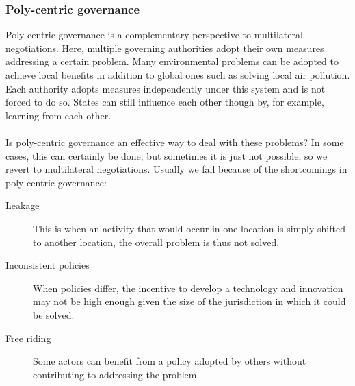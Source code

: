\documentclass[../summary.tex]{subfiles}
\begin{document}
		\subsubsection{Poly-centric governance}
			Poly-centric governance is a complementary perspective to multilateral negotiations. Here, multiple governing authorities adopt their own measures addressing a certain problem. Many environmental problems can be adopted to achieve local benefits in addition to global ones such as solving local air pollution. Each authority adopts measures independently under this system and is not forced to do so. States can still influence each other though by, for example, learning from each other. \\
			\\
			 Is poly-centric governance an effective way to deal with these problems? In some cases, this can certainly be done; but sometimes it is just not possible, so we revert to multilateral negotiations. Usually we fail because of the shortcomings in poly-centric governance:
			 \begin{description}
			 	\item[Leakage] This is when an activity that would occur in one location is simply shifted to another location, the overall problem is thus not solved.
			 	\item[Inconsistent policies] When policies differ, the incentive to develop a technology and innovation may not be high enough given the size of the jurisdiction in which it could be solved. 
			 	\item[Free riding] Some actors can benefit from a policy adopted by others without contributing to addressing the problem.
			 \end{description}
\end{document}
